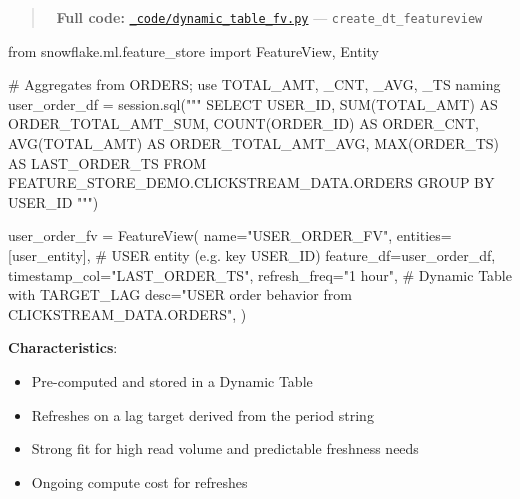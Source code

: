 \documentclass[
  letterpaper,
  DIV=11,
  numbers=noendperiod]{scrreprt}
\newenvironment{Shaded}{\begin{snugshade}}{\end{snugshade}}
\newcommand{\CommentTok}[1]{\textcolor[rgb]{0.37,0.37,0.37}{#1}}
\newcommand{\ImportTok}[1]{\textcolor[rgb]{0.00,0.46,0.62}{#1}}
\newcommand{\NormalTok}[1]{\textcolor[rgb]{0.00,0.23,0.31}{#1}}
\newcommand{\OperatorTok}[1]{\textcolor[rgb]{0.37,0.37,0.37}{#1}}
\newcommand{\StringTok}[1]{\textcolor[rgb]{0.13,0.47,0.30}{#1}}
\providecommand{\tightlist}{%
  \setlength{\itemsep}{0pt}\setlength{\parskip}{0pt}}\usepackage{longtable,booktabs,array}
\begin{document}
\begin{quote}
📁 \textbf{Full code:}
\href{_code/dynamic_table_fv.py}{\texttt{\_code/dynamic\_table\_fv.py}}
--- \texttt{create\_dt\_featureview}
\end{quote}

\begin{Shaded}
\begin{Highlighting}[]
\ImportTok{from}\NormalTok{ snowflake.ml.feature\_store }\ImportTok{import}\NormalTok{ FeatureView, Entity}

\CommentTok{\# Aggregates from ORDERS; use TOTAL\_AMT, \_CNT, \_AVG, \_TS naming}
\NormalTok{user\_order\_df }\OperatorTok{=}\NormalTok{ session.sql(}\StringTok{"""}
\StringTok{    SELECT}
\StringTok{        USER\_ID,}
\StringTok{        SUM(TOTAL\_AMT) AS ORDER\_TOTAL\_AMT\_SUM,}
\StringTok{        COUNT(ORDER\_ID) AS ORDER\_CNT,}
\StringTok{        AVG(TOTAL\_AMT) AS ORDER\_TOTAL\_AMT\_AVG,}
\StringTok{        MAX(ORDER\_TS) AS LAST\_ORDER\_TS}
\StringTok{    FROM FEATURE\_STORE\_DEMO.CLICKSTREAM\_DATA.ORDERS}
\StringTok{    GROUP BY USER\_ID}
\StringTok{"""}\NormalTok{)}

\NormalTok{user\_order\_fv }\OperatorTok{=}\NormalTok{ FeatureView(}
\NormalTok{    name}\OperatorTok{=}\StringTok{"USER\_ORDER\_FV"}\NormalTok{,}
\NormalTok{    entities}\OperatorTok{=}\NormalTok{[user\_entity],  }\CommentTok{\# USER entity (e.g. key USER\_ID)}
\NormalTok{    feature\_df}\OperatorTok{=}\NormalTok{user\_order\_df,}
\NormalTok{    timestamp\_col}\OperatorTok{=}\StringTok{"LAST\_ORDER\_TS"}\NormalTok{,}
\NormalTok{    refresh\_freq}\OperatorTok{=}\StringTok{"1 hour"}\NormalTok{,  }\CommentTok{\# Dynamic Table with TARGET\_LAG}
\NormalTok{    desc}\OperatorTok{=}\StringTok{"USER order behavior from CLICKSTREAM\_DATA.ORDERS"}\NormalTok{,}
\NormalTok{)}
\end{Highlighting}
\end{Shaded}

\textbf{Characteristics}:

\begin{itemize}
\tightlist
\item
  Pre-computed and stored in a Dynamic Table
\item
  Refreshes on a lag target derived from the period string
\item
  Strong fit for high read volume and predictable freshness needs
\item
  Ongoing compute cost for refreshes
\end{itemize}
\end{document}
